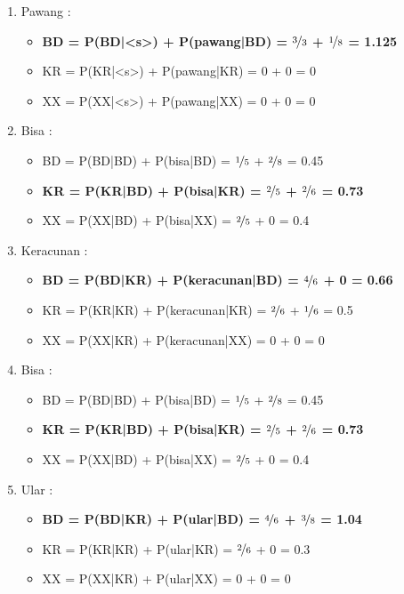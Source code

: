 \documentclass[paper=a4, fontsize=11pt]{scrartcl} %
\numberwithin{equation}{section} %
\numberwithin{figure}{section} %
\numberwithin{table}{section} %
\begin{document}
\begin{enumerate}
	\item Pawang :
	\begin{itemize}
		\item \textbf{BD = P(BD|<s>) + P(pawang|BD) = $\nicefrac{3}{3}$ + $\nicefrac{1}{8}$ = 1.125}				
		\item KR = P(KR|<s>) + P(pawang|KR) = 0 + 0 = 0
		\item XX = P(XX|<s>) + P(pawang|XX) = 0 + 0 = 0				
	\end{itemize}
	\item Bisa :
	\begin{itemize}
		\item BD = P(BD|BD) + P(bisa|BD) = $\nicefrac{1}{5}$ + $\nicefrac{2}{8}$ = 0.45
		\item \textbf{KR = P(KR|BD) + P(bisa|KR) = $\nicefrac{2}{5}$ + $\nicefrac{2}{6}$ = 0.73}
		\item XX = P(XX|BD) + P(bisa|XX) = $\nicefrac{2}{5}$ + 0 = 0.4				
	\end{itemize}
	\item Keracunan :
	\begin{itemize}
		\item \textbf{BD = P(BD|KR) + P(keracunan|BD) = $\nicefrac{4}{6}$ + 0 = 0.66}
		\item KR = P(KR|KR) + P(keracunan|KR) = $\nicefrac{2}{6}$ + $\nicefrac{1}{6}$ = 0.5
		\item XX = P(XX|KR) + P(keracunan|XX) = 0 + 0 = 0				
	\end{itemize}
	\item Bisa : 
	\begin{itemize}
		\item BD = P(BD|BD) + P(bisa|BD) = $\nicefrac{1}{5}$ + $\nicefrac{2}{8}$ = 0.45
		\item \textbf{KR = P(KR|BD) + P(bisa|KR) = $\nicefrac{2}{5}$ + $\nicefrac{2}{6}$ = 0.73}
		\item XX = P(XX|BD) + P(bisa|XX) = $\nicefrac{2}{5}$ + 0 = 0.4				
	\end{itemize}
	\item Ular :
	\begin{itemize}
		\item \textbf{BD = P(BD|KR) + P(ular|BD) = $\nicefrac{4}{6}$ + $\nicefrac{3}{8}$ = 1.04}
		\item KR = P(KR|KR) + P(ular|KR) = $\nicefrac{2}{6}$ + 0 = 0.3
		\item XX = P(XX|KR) + P(ular|XX) = 0 + 0 = 0				
	\end{itemize}	
\end{enumerate}
\end{document}
